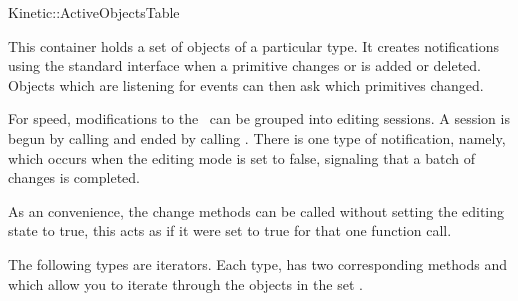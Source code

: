 

\begin{ccRefConcept}{Kinetic::ActiveObjectsTable}  %


\ccDefinition
  

This container holds a set of objects of a particular type. It creates
notifications using the standard 
interface when a primitive changes or is added or deleted. Objects
which are listening for events can then ask which primitives changed.

For speed, modifications to the \ccRefName\ can be grouped into
editing sessions. A session is begun by calling
 and ended by calling .
There is one type of notification, namely, 
which occurs when the editing mode is set to false, signaling that a
batch of changes is completed.

As an convenience, the change methods can be called without setting
the editing state to true, this acts as if it were set to true for
that one function call.

\ccTypes




The following types are iterators. Each type,  has
two corresponding methods  and  which
allow you to iterate through the objects in the set .




\end{ccRefConcept}
